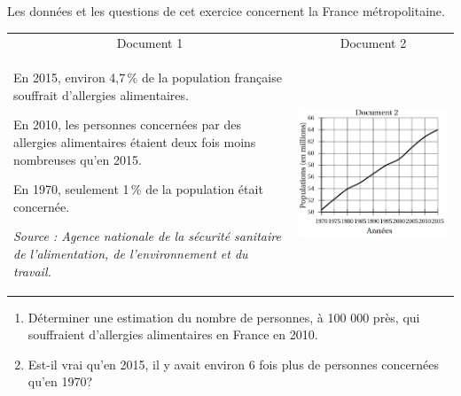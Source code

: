 
Les données et les questions de cet exercice concernent la France métropolitaine.

\begin{center}
\begin{tabularx}{\linewidth}{|m{8cm}|X|}\hline

\multicolumn{1}{|c|}{Document 1}&\multicolumn{1}{|c|}{Document 2}\\

En 2015, environ 4,7\,\% de la population française souffrait d'allergies alimentaires.

En 2010, les personnes concernées par des allergies alimentaires étaient deux fois moins nombreuses qu'en 2015.

En 1970, seulement 1\,\% de la
population était concernée.

{\footnotesize \emph{Source : Agence nationale de la sécurité sanitaire de l'alimentation, de l'environnement et du
travail.}}&

\includegraphics[scale=0.8]{NF-44.png} 


\end{tabularx}
\end{center}

\begin{enumerate}
\item Déterminer une estimation du nombre de personnes, à 100 000 près, qui souffraient d’allergies alimentaires en France en 2010.
\item Est-il vrai qu’en 2015, il y avait environ 6 fois plus de personnes concernées qu’en 1970?
\end{enumerate}
